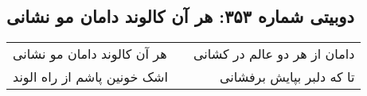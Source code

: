 \begin{center}
\section*{دوبیتی شماره ۳۵۳: هر آن کالوند دامان مو نشانی}
\label{sec:353}
\begin{longtable}{l p{0.5cm} r}
هر آن کالوند دامان مو نشانی
&&
دامان از هر دو عالم در کشانی
\\
اشک خونین پاشم از راه الوند
&&
تا که دلبر بپایش برفشانی
\\
\end{longtable}
\end{center}
